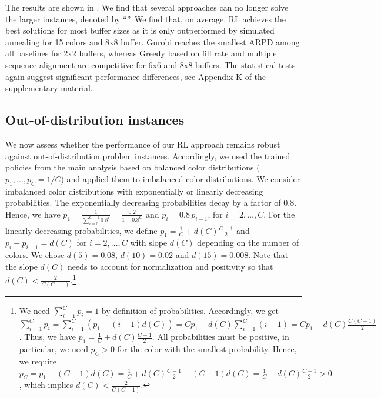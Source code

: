 \documentclass[11pt]{elsarticle}
\newcommand{\blackversion}{ }
\newcommand{\blackorcolor}{
\ifdefined\blackversion
	\color{black}
\fi
}
\newcommand{\REV}[1]{{\color{myblue}\blackorcolor #1}}
\begin{document}

The results are shown in . We find that several approaches can no longer solve the larger instances, denoted by ``\textendash''.
We find that, on average, RL achieves the best solutions for most buffer sizes as it is only outperformed by simulated annealing for 15 colors and 8x8 buffer. Gurobi reaches the smallest ARPD among all baselines for 2x2 buffers, whereas Greedy based on fill rate and multiple sequence alignment are competitive for 6x6 and 8x8 buffers. \REV{The statistical tests again suggest significant performance differences, see Appendix K of the supplementary material.}


\subsection{Out-of-distribution instances}

We now assess whether the performance of our RL approach remains robust against out-of-distribution problem instances. Accordingly, we used the trained policies from the main analysis based on balanced color distributions ($p_1,\dots, p_C = 1/C$) and applied them to imbalanced color distributions. We consider imbalanced color distributions with exponentially or linearly decreasing probabilities. The exponentially decreasing probabilities decay by a factor of $0.8$. Hence, we have $p_1=\frac{1}{\sum_{i=0}^{C-1} 0.8^{i}}=\frac{0.2}{1-0.8^C}$ and $p_{i}=0.8\,p_{i-1}$, for $i=2,\dots,C$. 
For the linearly decreasing probabilities, we define $p_1=\frac{1}{C}+d(C)\frac{C-1}{2}$ and $p_i-p_{i-1}=d(C)$ for $i=2,\dots,C$ with slope $d(C)$ depending on the number of colors. We chose $d(5)= 0.08$, $d(10)=0.02$ and $d(15)=0.008$.
Note that the slope $d(C)$ needs to account for normalization and positivity so that $d(C) < \frac{2}{C(C-1)}$.\footnote{We need $\sum_{i=1}^C p_i = 1$ by definition of probabilities. Accordingly, we get $\sum_{i=1}^C p_i = \sum_{i=1}^C (p_1-(i-1)d(C))=Cp_1-d(C)\sum_{i=1}^C(i-1)=C p_1-d(C) \frac{C(C-1)}{2}$. Thus, we have $p_1=\frac{1}{C}+d(C)\frac{C-1}{2}$. All probabilities must be positive, in particular, we need $p_C>0 $ for the color with the smallest probability. Hence, we require $p_C = p_1-(C-1)d(C)=\frac{1}{C}+d(C)\frac{C-1}{2}-(C-1)d(C)=\frac{1}{C}-d(C)\frac{C-1}{2} > 0$, which implies $d(C)<\frac{2}{C(C-1)}$.}

\end{document}
